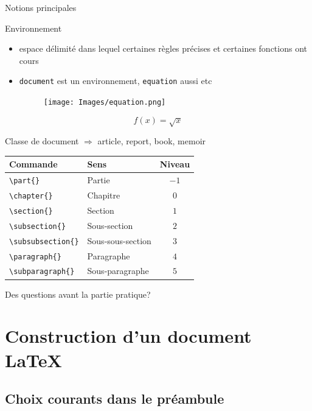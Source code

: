 \documentclass[8pt]{beamer}\usepackage[]{graphicx}\usepackage[]{xcolor}
\newcommand{\nomfonction}[2][]{\texttt{\textbackslash#2\{#1\}}}
\begin{document}
	\begin{frame}{Notions principales}
	 \begin{block}{Environnement}
	 \begin{itemize}
 \item espace délimité dans lequel certaines règles précises et certaines fonctions ont cours
 \item \texttt{document} est un environnement, \texttt{equation} aussi etc
 \begin{figure}
 \texttt{[image: Images/equation.png]}
 \end{figure}
\end{itemize}
\begin{equation}
  f(x)=\sqrt{x} %
  \end{equation}
	  \end{block}
	  
	 \begin{block}{Classe de document}
	 $\Rightarrow$ article, report, book, memoir
	  \begin{table}[!ht]
  \centering\footnotesize
  \begin{tabular}{|l|l|c|}
  \hline Commande & Sens & Niveau\\
  \hline \nomfonction{part} & Partie & $-1$\\
  \nomfonction{chapter} & Chapitre & $0$\\
  \nomfonction{section} & Section & $1$\\
  \nomfonction{subsection} & Sous-section & $2$\\
  \nomfonction{subsubsection} & Sous-sous-section & $3$\\
  \nomfonction{paragraph} & Paragraphe & $4$\\
  \nomfonction{subparagraph} & Sous-paragraphe & $5$\\
  \hline
  \end{tabular}
\end{table}
	  \end{block}
	\end{frame}
	
	\begin{frame}
	Des questions avant la partie pratique?
	\end{frame}

\section{Construction d'un document \LaTeX}
\subsection{Choix courants dans le préambule}
\end{document}
